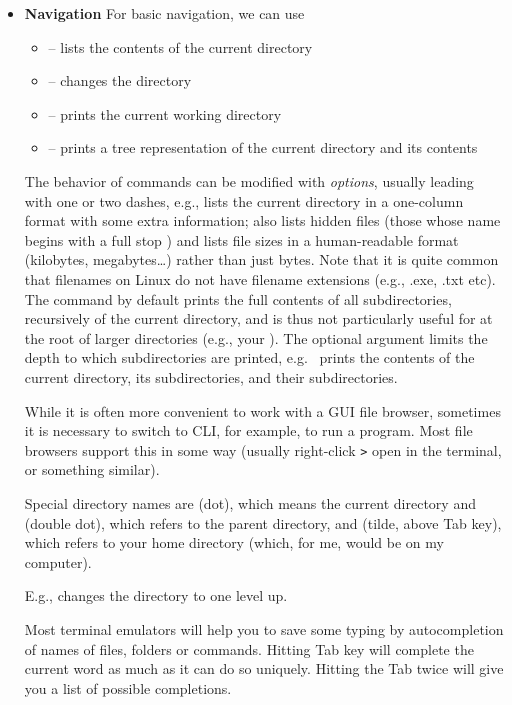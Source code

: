 \begin{itemize}
\item
  \textbf{Navigation}
  For basic navigation, we can use
  \begin{itemize}
  \setlength\itemsep{1pt}
  \item
     -- lists the contents of the current directory
  \item
     -- changes the directory
  \item
     -- prints the current working directory
  \item
     -- prints a tree representation of the current
    directory and its contents
  \end{itemize}

  The behavior of commands can be modified with \emph{options}, usually leading with one or two dashes, e.g.,  lists the current directory in a one-column format with some extra information;  also lists hidden files (those whose name begins with a full stop ) and  lists file sizes in a human-readable format (kilobytes, megabytes\ldots) rather than just bytes. Note that it is quite common that filenames on Linux do not have filename extensions (e.g., .exe, .txt etc). The command  by default prints the full contents of all subdirectories, recursively of the current directory, and is thus not particularly useful for at the root of larger directories (e.g., your  \ls{\~}). The optional argument   limits the depth to which subdirectories are printed,  e.g.~ prints the contents of the current directory, its subdirectories, and their subdirectories.

  While it is often more convenient to work with a GUI file browser, sometimes it is necessary to switch to CLI, for example, to run a program. Most file browsers support this in some way (usually right-click \verb|>| open in the terminal, or something similar).

  Special directory names are \ls{\.} (dot), which means the current directory and  (double dot), which refers to the parent directory, and \ls{\~} (tilde, above Tab key), which refers to your home directory (which, for me, would be  on my computer).

  E.g.,  changes the directory to one level up.

  Most terminal emulators will help you to save some typing by autocompletion of names of files, folders or commands. Hitting Tab key will complete the current word as much as it can do so uniquely. Hitting the Tab twice will give you a list of possible completions.


\end{itemize}
